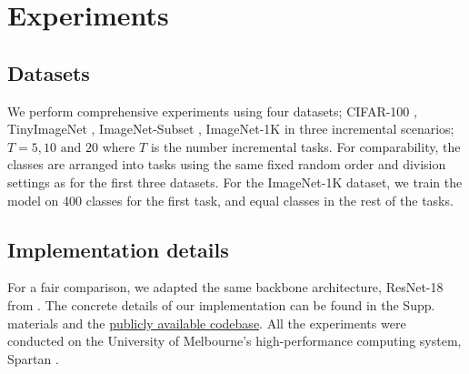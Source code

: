 \documentclass[10pt,twocolumn,letterpaper]{article}
\begin{document}
\section{Experiments}

\subsection{Datasets}
We perform comprehensive experiments using four datasets; CIFAR-100 \cite{Krizhevsky2009LearningImages}, TinyImageNet \cite{Le2015TinyChallenge}, ImageNet-Subset \cite{Deng2009Imagenet:Database}, ImageNet-1K \cite{Deng2009Imagenet:Database} in three incremental scenarios; $T=5, 10 \text{ and } 20$ where $T$ is the number incremental tasks. For comparability, the classes are arranged into tasks using the same fixed random order and division settings as \cite{Zhu2021PrototypeLearning, Zhu2022Self-SustainingLearning} for the first three datasets. For the ImageNet-1K dataset, we train the model on 400 classes for the first task, and equal classes in the rest of the tasks. 


\subsection{Implementation details} \label{sec:impl}
For a fair comparison, we adapted the same backbone architecture, ResNet-18 \cite{He2016DeepRecognition} from \cite{Zhu2021PrototypeLearning}. The concrete details of our implementation can be found in the Supp. materials and the \href{https://github.com/TamashaM/NAPA-VQ.git}{publicly available codebase}.
All the experiments were conducted on the University of Melbourne’s high-performance computing system, Spartan \cite{Lafayette2016SpartanChimera}.
\end{document}
